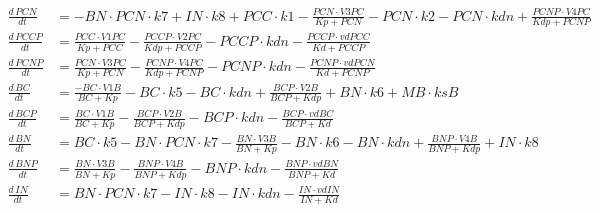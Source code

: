 \begin{model}[p]
\begin{align*}
    \frac{d\,\mathit{PCN}}{dt} &= - \mathit{BN} \cdot \mathit{PCN} \cdot \mathit{k7} + \mathit{IN} \cdot \mathit{k8} + \mathit{PCC} \cdot \mathit{k1} - \frac{\mathit{PCN} \cdot \mathit{V3PC}}{\mathit{Kp} + \mathit{PCN}} - \mathit{PCN} \cdot \mathit{k2} - \mathit{PCN} \cdot \mathit{kdn} + \frac{\mathit{PCNP} \cdot \mathit{V4PC}}{\mathit{Kdp} + \mathit{PCNP}}\\
    \frac{d\,\mathit{PCCP}}{dt} &= \frac{\mathit{PCC} \cdot \mathit{V1PC}}{\mathit{Kp} + \mathit{PCC}} - \frac{\mathit{PCCP} \cdot \mathit{V2PC}}{\mathit{Kdp} + \mathit{PCCP}} - \mathit{PCCP} \cdot \mathit{kdn} - \frac{\mathit{PCCP} \cdot \mathit{vdPCC}}{\mathit{Kd} + \mathit{PCCP}}\\
    \frac{d\,\mathit{PCNP}}{dt} &= \frac{\mathit{PCN} \cdot \mathit{V3PC}}{\mathit{Kp} + \mathit{PCN}} - \frac{\mathit{PCNP} \cdot \mathit{V4PC}}{\mathit{Kdp} + \mathit{PCNP}} - \mathit{PCNP} \cdot \mathit{kdn} - \frac{\mathit{PCNP} \cdot \mathit{vdPCN}}{\mathit{Kd} + \mathit{PCNP}}\\
    \frac{d\,\mathit{BC}}{dt} &= \frac{- \mathit{BC} \cdot \mathit{V1B}}{\mathit{BC} + \mathit{Kp}} - \mathit{BC} \cdot \mathit{k5} - \mathit{BC} \cdot \mathit{kdn} + \frac{\mathit{BCP} \cdot \mathit{V2B}}{\mathit{BCP} + \mathit{Kdp}} + \mathit{BN} \cdot \mathit{k6} + \mathit{MB} \cdot \mathit{ksB}\\
    \frac{d\,\mathit{BCP}}{dt} &= \frac{\mathit{BC} \cdot \mathit{V1B}}{\mathit{BC} + \mathit{Kp}} - \frac{\mathit{BCP} \cdot \mathit{V2B}}{\mathit{BCP} + \mathit{Kdp}} - \mathit{BCP} \cdot \mathit{kdn} - \frac{\mathit{BCP} \cdot \mathit{vdBC}}{\mathit{BCP} + \mathit{Kd}}\\
    \frac{d\,\mathit{BN}}{dt} &= \mathit{BC} \cdot \mathit{k5} - \mathit{BN} \cdot \mathit{PCN} \cdot \mathit{k7} - \frac{\mathit{BN} \cdot \mathit{V3B}}{\mathit{BN} + \mathit{Kp}} - \mathit{BN} \cdot \mathit{k6} - \mathit{BN} \cdot \mathit{kdn} + \frac{\mathit{BNP} \cdot \mathit{V4B}}{\mathit{BNP} + \mathit{Kdp}} + \mathit{IN} \cdot \mathit{k8}\\
    \frac{d\,\mathit{BNP}}{dt} &= \frac{\mathit{BN} \cdot \mathit{V3B}}{\mathit{BN} + \mathit{Kp}} - \frac{\mathit{BNP} \cdot \mathit{V4B}}{\mathit{BNP} + \mathit{Kdp}} - \mathit{BNP} \cdot \mathit{kdn} - \frac{\mathit{BNP} \cdot \mathit{vdBN}}{\mathit{BNP} + \mathit{Kd}}\\
    \frac{d\,\mathit{IN}}{dt} &= \mathit{BN} \cdot \mathit{PCN} \cdot \mathit{k7} - \mathit{IN} \cdot \mathit{k8} - \mathit{IN} \cdot \mathit{kdn} - \frac{\mathit{IN} \cdot \mathit{vdIN}}{\mathit{IN} + \mathit{Kd}}\\
  \end{align*}
\end{model}

